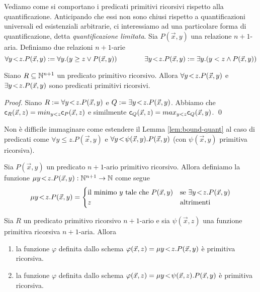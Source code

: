 \documentclass[runningheads,a4paper]{llncs}
\begin{document}
Vediamo come si comportano i predicati primitivi ricorsivi rispetto alla quantificazione. Anticipando che essi non sono chiusi rispetto a quantificazioni universali ed esistenziali arbitrarie, ci interessiamo ad una particolare forma di quantificazione, detta \emph{quantificazione limitata}. Sia $P(\vec x,y)$ una relazione $n+1$-aria. Definiamo due relazioni $n+1$-arie
$$ \forall{y}\!<\!{z}.P(\vec x,y) \mathrel{:=} \forall y.(y \geq z \vee P(\vec x,y)) \qquad\qquad \exists{y}\!<\!{z}.P(\vec x,y) \mathrel{:=} \exists y.(y < z \wedge P(\vec x,y)) $$

\begin{lemma}\label{lem:bound-quant}
Siano $R\subseteq \mathbb{N}^{n+1}$ un predicato primitivo ricorsivo. Allora $\forall{y}\!<\!{z}.P(\vec x,y)$ e $\exists{y}\!<\!{z}.P(\vec x,y)$ sono predicati primitivi ricorsivi.
\end{lemma}

\begin{proof}
Siano $R \mathrel{:=} \forall{y}\!<\!{z}.P(\vec x,y)$ e $Q \mathrel{:=} \exists{y}\!<\!{z}.P(\vec x,y)$. Abbiamo che $\mathsf{c}_{R}(\vec x,z) = min_{y < z} \mathsf{c}_{P}(\vec x,z)$ e similmente $\mathsf{c}_{Q}(\vec x,z) = max_{y < z} \mathsf{c}_{Q}(\vec x,y)$.
\qed\end{proof}

Non \`{e} difficile immaginare come estendere il Lemma \ref{lem:bound-quant} al caso di predicati come $\forall y\!\leq\!z.P(\vec x,y)$ e $\forall{y}\!<\!{\psi(\vec x,y)}.P(\vec x,y)$ (con $\psi(\vec x,y)$ primitiva ricorsiva).

\begin{definition}\label{def:mu-rec-lim}
Sia $P(\vec x,y)$ un predicato $n+1$-ario primitivo ricorsivo. Allora definiamo la funzione $\mu{y}\!<\!{z}.P(\vec x,y): \mathbb{N}^{n+1} \to \mathbb{N}$ come segue
$$
\mu{y}\!<\!{z}.P(\vec x,y) = 
\begin{cases}
\mbox{il minimo $y$ tale che $P(\vec x,y)$} & \mbox{se } \exists{y}\!<\!{z}.P(\vec x,y) \\
z & \mbox{altrimenti} \\
\end{cases}
$$
\end{definition}

\begin{lemma}\label{lem:def-mu-lim}
Sia $R$ un predicato primitivo ricorsivo $n+1$-ario e sia $\psi(\vec x,z)$ una funzione primitiva ricorsiva $n+1$-aria. Allora
\begin{enumerate}[label=(\roman*)]
\item la funzione $\varphi$ definita dallo schema $\varphi(\vec x,z) = \mu{y}\!<\!{z}.P(\vec x,y)$ \`{e} primitiva ricorsiva.
\item la funzione $\varphi$ definita dallo schema $\varphi(\vec x,z) = \mu{y}\!<\!{\psi(\vec x,z)}.P(\vec x,y)$ \`{e} primitiva ricorsiva.
\end{enumerate}
\end{lemma}
\end{document}

